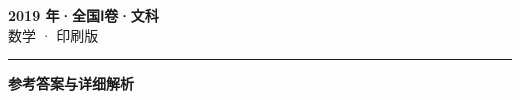 \documentclass[zihao=5, a4paper]{ctexart}
\begin{document}
\begin{center}
  {\Large\bfseries 2019 年·全国Ⅰ卷·文科}\\[4pt]
  {\large 数学 · 印刷版}
\end{center}
\medskip
{}

\par\bigskip\hrule\bigskip
{}
\begin{center}{\large\bfseries 参考答案与详细解析}\end{center}
\smallskip

\end{document}
